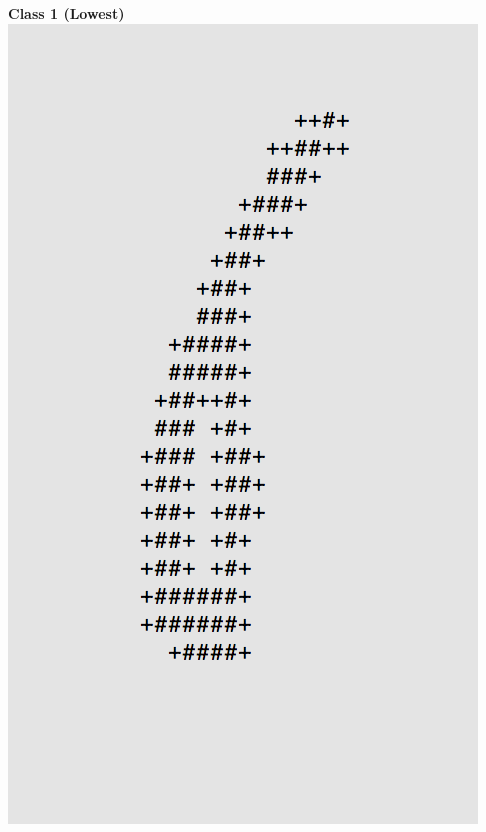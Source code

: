 \documentclass[11pt]{article}
\begin{document}
\begin{center}
\begin{multicols}{2}
\textbf{Class 1 (Lowest)}\\
\includegraphics[scale=0.4]{part1/1/low_1.png}
\end{multicols}
\end{center}
\end{document}
